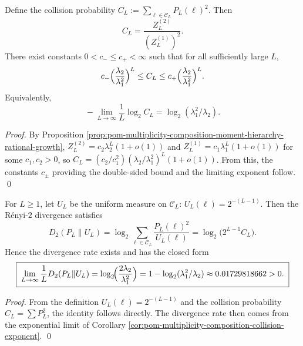 \begin{corollary}\label{cor:pom-multiplicity-composition-collision-exponent}
Define the collision probability
\(
C_L:=\sum_{\boldsymbol{\ell}\in\mathcal{C}_L}P_L(\boldsymbol{\ell})^2
\).
Then
\[
\boxed{\;C_L=\frac{Z_L^{(2)}}{(Z_L^{(1)})^2}.\;}
\]
There exist constants \(0<c_-\le c_+<\infty\) such that for all sufficiently large \(L\),
\[
c_-\Bigl(\frac{\lambda_2}{\lambda_1^2}\Bigr)^L
\le C_L\le
c_+\Bigl(\frac{\lambda_2}{\lambda_1^2}\Bigr)^L.
\]
Equivalently,
\[
\boxed{\;-\lim_{L\to\infty}\frac{1}{L}\log_2 C_L=\log_2(\lambda_1^2/\lambda_2).\;}
\]
\end{corollary}
\begin{proof}
By Proposition \ref{prop:pom-multiplicity-composition-moment-hierarchy-rational-growth},
\(
Z_L^{(2)}=c_2\lambda_2^L(1+o(1))
\)
and
\(
Z_L^{(1)}=c_1\lambda_1^L(1+o(1))
\)
for some \(c_1,c_2>0\), so
\(
C_L=(c_2/c_1^2)(\lambda_2/\lambda_1^2)^L(1+o(1))
\).
From this, the constants \(c_\pm\) providing the double-sided bound and the limiting exponent follow. \qed
\end{proof}

\begin{corollary}\label{cor:pom-multiplicity-composition-renyi2-divergence-to-uniform}
For \(L\ge 1\), let \(U_L\) be the uniform measure on \(\mathcal{C}_L\): \(U_L(\boldsymbol{\ell})=2^{-(L-1)}\).
Then the R\'enyi-\(2\) divergence satisfies
\[
D_2(P_L\|U_L)
=\log_2\sum_{\boldsymbol{\ell}\in\mathcal{C}_L}\frac{P_L(\boldsymbol{\ell})^2}{U_L(\boldsymbol{\ell})}
=\log_2\bigl(2^{L-1}C_L\bigr).
\]
Hence the divergence rate exists and has the closed form
\[
\boxed{\;
\lim_{L\to\infty}\frac{1}{L}D_2(P_L\|U_L)
=\log_2\!\Bigl(\frac{2\lambda_2}{\lambda_1^2}\Bigr)
=1-\log_2(\lambda_1^2/\lambda_2)\approx 0.01729818662>0.\;}
\]
\end{corollary}
\begin{proof}
From the definition \(U_L(\boldsymbol{\ell})=2^{-(L-1)}\) and the collision probability \(C_L=\sum P_L^2\), the identity follows directly.
The divergence rate then comes from the exponential limit of Corollary \ref{cor:pom-multiplicity-composition-collision-exponent}. \qed
\end{proof}

